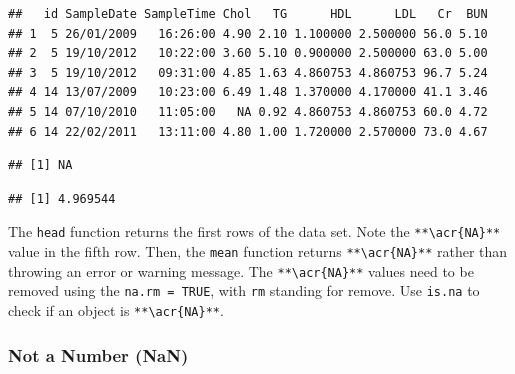 \documentclass[
]{book}
\newenvironment{Shaded}{\begin{snugshade}}{\end{snugshade}}
\newcommand{\AttributeTok}[1]{\textcolor[rgb]{0.13,0.29,0.53}{#1}}
\newcommand{\CommentTok}[1]{\textcolor[rgb]{0.56,0.35,0.01}{\textit{#1}}}
\newcommand{\ConstantTok}[1]{\textcolor[rgb]{0.56,0.35,0.01}{#1}}
\newcommand{\FunctionTok}[1]{\textcolor[rgb]{0.13,0.29,0.53}{\textbf{#1}}}
\newcommand{\NormalTok}[1]{#1}
\newcommand{\SpecialCharTok}[1]{\textcolor[rgb]{0.81,0.36,0.00}{\textbf{#1}}}
\begin{document}
\begin{verbatim}
##   id SampleDate SampleTime Chol   TG      HDL      LDL   Cr  BUN
## 1  5 26/01/2009   16:26:00 4.90 2.10 1.100000 2.500000 56.0 5.10
## 2  5 19/10/2012   10:22:00 3.60 5.10 0.900000 2.500000 63.0 5.00
## 3  5 19/10/2012   09:31:00 4.85 1.63 4.860753 4.860753 96.7 5.24
## 4 14 13/07/2009   10:23:00 6.49 1.48 1.370000 4.170000 41.1 3.46
## 5 14 07/10/2010   11:05:00   NA 0.92 4.860753 4.860753 60.0 4.72
## 6 14 22/02/2011   13:11:00 4.80 1.00 1.720000 2.570000 73.0 4.67
\end{verbatim}

\begin{Shaded}
\end{Shaded}

\begin{verbatim}
## [1] NA
\end{verbatim}

\begin{Shaded}
\end{Shaded}

\begin{verbatim}
## [1] 4.969544
\end{verbatim}

The \texttt{head} function returns the first rows of the data set. Note the \texttt{**\textbackslash{}acr\{NA\}**} value in the fifth row. Then, the \texttt{mean} function returns \texttt{**\textbackslash{}acr\{NA\}**} rather than throwing an error or warning message. The \texttt{**\textbackslash{}acr\{NA\}**} values need to be removed using the \texttt{na.rm\ =\ TRUE}, with \texttt{rm} standing for remove. Use \texttt{is.na} to check if an object is \texttt{**\textbackslash{}acr\{NA\}**}.

\subsubsection{Not a Number (NaN)}\label{sec:nan}
\end{document}
